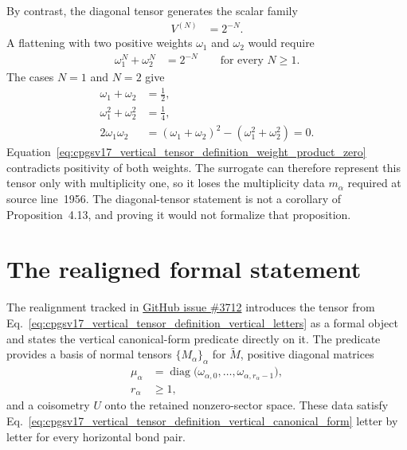 \documentclass{article}
\begin{document}
By contrast, the diagonal tensor generates the scalar family
\begin{align}
    V^{(N)}
        &=2^{-N}.
    \label{eq:cpgsv17_vertical_tensor_definition_diagonal_scalar_family}
\end{align}
A flattening with two positive weights $\omega_1$ and $\omega_2$ would require
\begin{align}
    \omega_1^N+\omega_2^N
        &=2^{-N}
        \qquad\text{for every }N\geq1.
    \label{eq:cpgsv17_vertical_tensor_definition_two_weight_power_sum}
\end{align}
The cases $N=1$ and $N=2$ give
\begin{align}
    \omega_1+\omega_2
        &=\frac{1}{2},
    \label{eq:cpgsv17_vertical_tensor_definition_power_sum_first}\\
    \omega_1^2+\omega_2^2
        &=\frac{1}{4},
    \label{eq:cpgsv17_vertical_tensor_definition_power_sum_second}\\
    2\omega_1\omega_2
        &=
        (\omega_1+\omega_2)^2
        -(\omega_1^2+\omega_2^2)
        =0.
    \label{eq:cpgsv17_vertical_tensor_definition_weight_product_zero}
\end{align}
Equation~\ref{eq:cpgsv17_vertical_tensor_definition_weight_product_zero}
contradicts positivity of both weights. The surrogate can therefore represent
this tensor only with multiplicity one, so it loses the multiplicity data
$m_\alpha$ required at source line~1956. The diagonal-tensor statement is not
a corollary of Proposition~4.13, and proving it would not formalize that
proposition.

\section{The realigned formal statement}

The realignment tracked in
\href{https://github.com/LionSR/TNLean/issues/3712}{GitHub issue \#3712}
introduces the tensor from
Eq.~\ref{eq:cpgsv17_vertical_tensor_definition_vertical_letters} as a formal
object and states the vertical canonical-form predicate directly on it. The
predicate provides a basis of normal tensors $\{M_\alpha\}_\alpha$ for
$\widetilde M$, positive diagonal matrices
\begin{align}
    \mu_\alpha
        &=
        \operatorname{diag}\bigl(        \omega_{\alpha,0},
            \ldots,
            \omega_{\alpha,r_\alpha-1}
        \bigr),
    \label{eq:cpgsv17_vertical_tensor_definition_diagonal_sector_weight}\\
    r_\alpha
        &\geq1,
    \label{eq:cpgsv17_vertical_tensor_definition_positive_multiplicity}
\end{align}
and a coisometry $U$ onto the retained nonzero-sector space. These data satisfy
Eq.~\ref{eq:cpgsv17_vertical_tensor_definition_vertical_canonical_form}
letter by letter for every horizontal bond pair.
\end{document}
